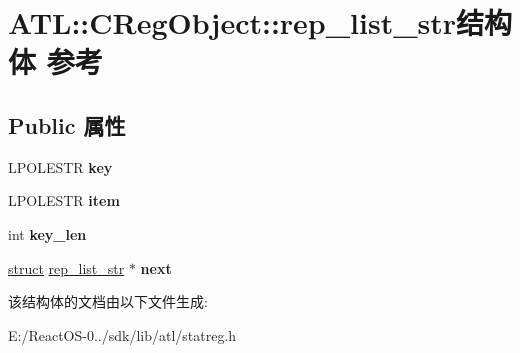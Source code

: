 \hypertarget{struct_a_t_l_1_1_c_reg_object_1_1rep__list__str}{}\section{A\+TL\+:\+:C\+Reg\+Object\+:\+:rep\+\_\+list\+\_\+str结构体 参考}
\label{struct_a_t_l_1_1_c_reg_object_1_1rep__list__str}
\subsection*{Public 属性}
\begin{DoxyCompactItemize}
\item 
\mbox{\label{struct_a_t_l_1_1_c_reg_object_1_1rep__list__str_ae6e500abe43ef0e428849f9bd5c135e9}} 
L\+P\+O\+L\+E\+S\+TR {\bfseries key}
\item 
\mbox{\label{struct_a_t_l_1_1_c_reg_object_1_1rep__list__str_a4986db500e6392db5d9bff5e0334fb9a}} 
L\+P\+O\+L\+E\+S\+TR {\bfseries item}
\item 
\mbox{\label{struct_a_t_l_1_1_c_reg_object_1_1rep__list__str_ae8a8a873416991cc3a6113465ef7a13a}} 
int {\bfseries key\+\_\+len}
\item 
\mbox{\label{struct_a_t_l_1_1_c_reg_object_1_1rep__list__str_af4070fd70dbd812042ba4e5990abb9cd}} 
\hyperlink{interfacestruct}{struct} \hyperlink{struct_a_t_l_1_1_c_reg_object_1_1rep__list__str}{rep\+\_\+list\+\_\+str} $\ast$ {\bfseries next}
\end{DoxyCompactItemize}


该结构体的文档由以下文件生成\+:\begin{DoxyCompactItemize}
\item 
E\+:/\+React\+O\+S-\/0../sdk/lib/atl/statreg.\+h\end{DoxyCompactItemize}
